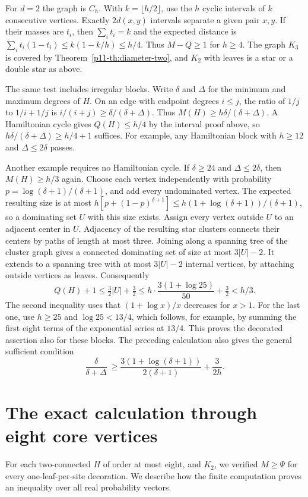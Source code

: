 \documentclass[11pt,a4paper]{article}
\begin{document}
For $d=2$ the graph is $C_h$. With $k=\lfloor h/2\rfloor$, use the $h$
cyclic intervals of $k$ consecutive vertices. Exactly $2d(x,y)$ intervals
separate a given pair $x,y$. If their masses are $t_i$, then
$\sum_i t_i=k$ and the expected distance is
$\sum_i t_i(1-t_i)\le k(1-k/h)\le h/4$. Thus $M-Q\ge1$ for $h\ge4$.
The graph $K_3$ is covered by Theorem~\ref{p11-th:diameter-two}, and $K_2$ with leaves is a star or a double star as above.

The same test includes irregular blocks. Write $\delta$ and $\Delta$
for the minimum and maximum degrees of $H$. On an edge with endpoint
degrees $i\le j$, the ratio of $1/j$ to $1/i+1/j$ is
$i/(i+j)\ge\delta/(\delta+\Delta)$. Thus
$M(H)\ge h\delta/(\delta+\Delta)$. A Hamiltonian cycle gives
$Q(H)\le h/4$ by the interval proof above, so
$h\delta/(\delta+\Delta)\ge h/4+1$ suffices. For example, any
Hamiltonian block with $h\ge12$ and $\Delta\le2\delta$ passes.

Another example requires no Hamiltonian cycle. If $\delta\ge24$ and
$\Delta\le2\delta$, then $M(H)\ge h/3$ again. Choose each vertex
independently with probability $p=\log(\delta+1)/(\delta+1)$, and add
every undominated vertex. The expected resulting size is at most
$h[p+(1-p)^{\delta+1}]\le h(1+\log(\delta+1))/(\delta+1)$, so a
dominating set $U$ with this size exists. Assign every vertex outside
$U$ to an adjacent center in $U$. Adjacency of the resulting star
clusters connects their centers by paths of length at most three.
Joining along a spanning tree of the cluster graph gives a connected
dominating set of size at most $3|U|-2$. It extends to a spanning tree
with at most $3|U|-2$ internal vertices, by attaching outside vertices
as leaves. Consequently
\[
 Q(H)+1\le \tfrac32|U|+\tfrac32
 \le h\cdot\frac{3(1+\log25)}{50}+\tfrac32 < h/3 .
\]
The second inequality uses that $(1+\log x)/x$ decreases for $x>1$.
For the last one, use $h\ge25$ and $\log25<13/4$, which follows, for
example, by summing the first eight terms of the exponential series
at $13/4$. This proves the decorated assertion also for these blocks.
The preceding calculation also gives the general sufficient condition
\[
 \frac{\delta}{\delta+\Delta}\ \ge \frac{3(1+\log(\delta+1))}{2(\delta+1)}+\frac{3}{2h}.
\]

\section{The exact calculation through eight core vertices}
For each two-connected $H$ of order at most eight, and $K_2$, we verified $M\ge\Psi$ for every one-leaf-per-site decoration. We describe how the finite computation proves an inequality over all real probability vectors.
\end{document}
